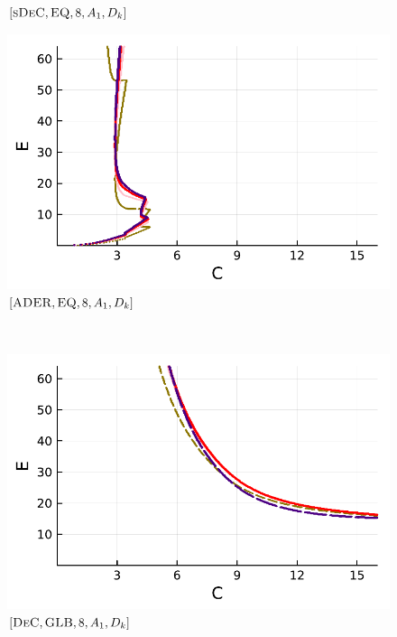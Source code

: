 \begin{figure}[!h]
\begin{minipage}[t]{0.32\textwidth}
		\centering
		$[\textsc{sDeC},\textsc{EQ}, 8, A_1,D_k]$
	\end{minipage}
	\begin{minipage}[t]{0.32\textwidth}
		\includegraphics[width=\textwidth]{pdf/pdepics/diff/IMEXADER_equispaced_diff_ord_2468.pdf}
		\centering
		$[\textsc{ADER},\textsc{EQ}, 8, A_1,D_k]$
	\end{minipage}\\
	\begin{minipage}[t]{0.32\textwidth}
		\includegraphics[width=\textwidth]{pdf/pdepics/diff/IMEXDeC_gaussLobatto_diff_ord_2468.pdf}
		\centering
		$[\textsc{DeC},\textsc{GLB}, 8, A_1,D_k]$
	\end{minipage} 
	\begin{minipage}[t]{0.32\textwidth}

\end{minipage}
\end{figure}
